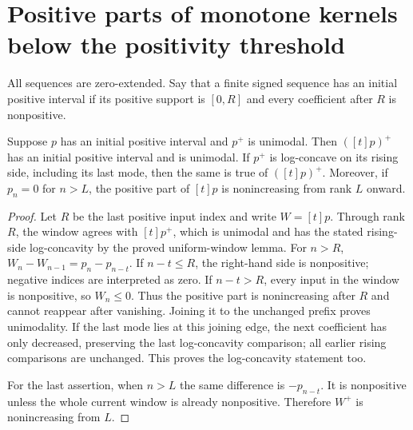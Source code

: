 \section{Positive parts of monotone kernels below the positivity threshold}
All sequences are zero-extended. Say that a finite signed sequence has
an initial positive interval if its positive support is $[0,R]$ and
every coefficient after $R$ is nonpositive.

\begin{lemma}
Suppose $p$ has an initial positive interval and $p^+$ is unimodal.
Then $([t]p)^+$ has an initial positive interval and is unimodal.
If $p^+$ is log-concave on its rising side, including its last mode,
then the same is true of $([t]p)^+$.
Moreover, if $p_n=0$ for $n>L$, the positive part of $[t]p$ is
nonincreasing from rank $L$ onward.
\end{lemma}
\begin{proof}
Let $R$ be the last positive input index and write $W=[t]p$.
Through rank $R$, the window agrees with $[t]p^+$, which is
unimodal and has the stated rising-side log-concavity by the
proved uniform-window lemma. For $n>R$,
$W_n-W_{n-1}=p_n-p_{n-t}$.
If $n-t\le R$, the right-hand side is nonpositive; negative indices
are interpreted as zero. If $n-t>R$, every input in the window is
nonpositive, so $W_n\le0$. Thus the positive part is nonincreasing
after $R$ and cannot reappear after vanishing. Joining it to the
unchanged prefix proves unimodality. If the last mode lies at this
joining edge, the next coefficient has only decreased, preserving
the last log-concavity comparison; all earlier rising comparisons
are unchanged. This proves the log-concavity statement too.

For the last assertion, when $n>L$ the same difference is
$-p_{n-t}$. It is nonpositive unless the whole current window is
already nonpositive. Therefore $W^+$ is nonincreasing from $L$.
\end{proof}

